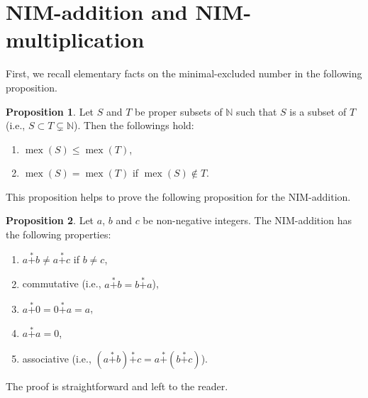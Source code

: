 \documentclass[a4paper,11pt]{amsart}
\theoremstyle{definition}
\newtheorem{prop}{Proposition}[section]
\newenvironment{demo}[1]{%
  \trivlist
  \item[\hskip\labelsep
        {\bf #1.}]
}{%
\hfill\qedsymbol
  \endtrivlist
}
\newcommand{\mex}{\operatorname{mex}}
\newcommand{\nimadd}{\overset{*}{+}}
\numberwithin{equation}{section}
\def\Non{\mathbb{N}}
\begin{document}
\section{NIM-addition and NIM-multiplication}\label{sc:appendix}
First, we recall elementary facts on the minimal-excluded number in the following proposition.
%
\begin{prop}\label{prop:NIM_subset}
	Let $S$ and $T$ be proper subsets of $\Non$
	such that $S$ is a subset of $T$
	(i.e., $S \subset T \subsetneq \Non$).
	Then the followings hold:
	\begin{enumerate}[label=(\roman*)] %
		\item
			$\mex(S) \leq \mex(T)$,
		\item
			$\mex(S) = \mex(T)$
			if $\mex(S) \notin T$.
	\end{enumerate} %
\end{prop}
%
%
This proposition helps to prove the following proposition for the NIM-addition.
\begin{prop}\label{prop:FT_NIM_add}
	Let $a$, $b$ and $c$ be non-negative integers.
	The NIM-addition has the following properties:
	\begin{enumerate}[label=(\Roman*)] %
		\item\label{property:injectivity_of_NIM_add}
			$a \nimadd b \neq a \nimadd c$ if $b \neq c$,
		\item	commutative (i.e., $a \nimadd b = b \nimadd a$),
		\item	$a \nimadd 0 = 0 \nimadd a = a$,
		\item	$a \nimadd a = 0$,
		\item	associative (i.e., $(a \nimadd b) \nimadd c = a \nimadd (b \nimadd c)$).
	\end{enumerate} %
\end{prop}
%
\begin{demo}{Proof}
%
The proof is straightforward and left to the reader.
%
\end{demo}
%
%
\end{document}
